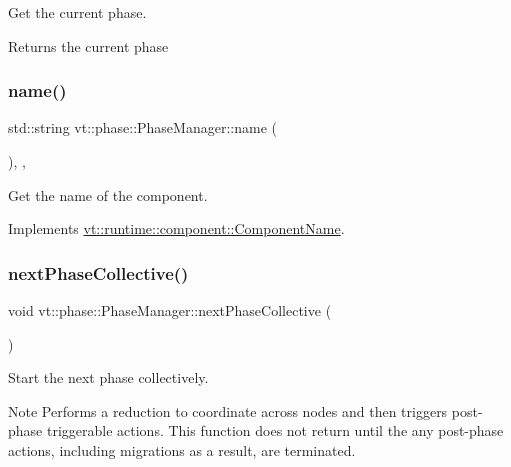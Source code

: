 Get the current phase. 

\begin{DoxyReturn}{Returns}
the current phase 
\end{DoxyReturn}
\mbox{\label{structvt_1_1phase_1_1_phase_manager_a159d95eca1eedeef33f245a3c232037d}} 
\subsubsection{\texorpdfstring{name()}{name()}}
{\footnotesize\ttfamily std\+::string vt\+::phase\+::\+Phase\+Manager\+::name (\begin{DoxyParamCaption}{ }\end{DoxyParamCaption})\hspace{0.3cm}{\ttfamily [inline]}, {\ttfamily [override]}, {\ttfamily [virtual]}}



Get the name of the component. 



Implements \hyperlink{structvt_1_1runtime_1_1component_1_1_component_name_a33c06229bb605a2b2ceff68830d6d773}{vt\+::runtime\+::component\+::\+Component\+Name}.

\mbox{\label{structvt_1_1phase_1_1_phase_manager_ac94bfde4a103cbdec426542191c41092}} 
\subsubsection{\texorpdfstring{next\+Phase\+Collective()}{nextPhaseCollective()}}
{\footnotesize\ttfamily void vt\+::phase\+::\+Phase\+Manager\+::next\+Phase\+Collective (\begin{DoxyParamCaption}{ }\end{DoxyParamCaption})}



Start the next phase collectively. 

\begin{DoxyNote}{Note}
Performs a reduction to coordinate across nodes and then triggers post-\/phase triggerable actions. This function does not return until the any post-\/phase actions, including migrations as a result, are terminated. 
\end{DoxyNote}
\mbox{\label{structvt_1_1phase_1_1_phase_manager_aa8db0caf0fcef7fe3ead90de2adda963}} 
